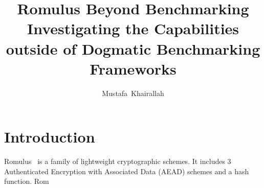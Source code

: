 \documentclass[10pt,a4paper]{article}
\author{Mustafa~Khairallah}
\title{Romulus Beyond Benchmarking\\\Large Investigating the Capabilities outside of Dogmatic Benchmarking Frameworks}
\begin{document}
\maketitle
\section{Introduction}

Romulus~\cite{} is a family of lightweight cryptographic schemes. It includes 3 Authenticated Encryption with Associated Data (AEAD) schemes and a hash function. Rom
\end{document}
